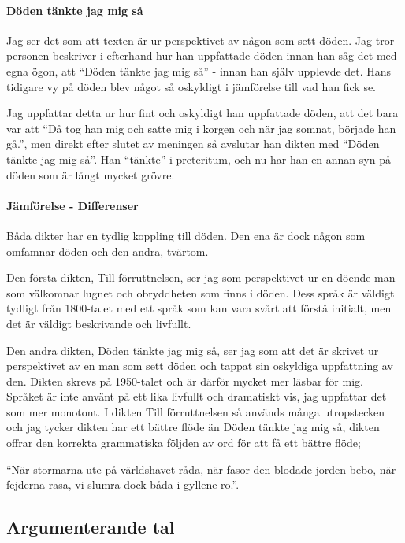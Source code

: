 \paragraph{Döden tänkte jag mig så}

Jag ser det som att texten är ur perspektivet av någon som sett döden. Jag tror personen beskriver i efterhand hur han uppfattade döden innan han såg det med egna ögon, att “Döden tänkte jag mig så” - innan han själv upplevde det. Hans tidigare vy på döden blev något så oskyldigt i jämförelse till vad han fick se.

Jag uppfattar detta ur hur fint och oskyldigt han uppfattade döden, att det bara var att “Då tog han mig och satte mig i korgen och när jag somnat, började han gå.”, men direkt efter slutet av meningen så avslutar han dikten med “Döden tänkte jag mig så”. Han “tänkte” i preteritum, och nu har han en annan syn på döden som är långt mycket grövre.

\paragraph{Jämförelse - Differenser}

Båda dikter har en tydlig koppling till döden. Den ena är dock någon som omfamnar döden och den andra, tvärtom.

Den första dikten, Till förruttnelsen, ser jag som perspektivet ur en döende man som välkomnar lugnet och obryddheten som finns i döden. Dess språk är väldigt tydligt från 1800-talet med ett språk som kan vara svårt att förstå initialt, men det är väldigt beskrivande och livfullt.

Den andra dikten, Döden tänkte jag mig så, ser jag som att det är skrivet ur perspektivet av en man som sett döden och tappat sin oskyldiga uppfattning av den. Dikten skrevs på 1950-talet och är därför mycket mer läsbar för mig. Språket är inte använt på ett lika livfullt och dramatiskt vis, jag uppfattar det som mer monotont. I dikten Till förruttnelsen så används många utropstecken och jag tycker dikten har ett bättre flöde än Döden tänkte jag mig så, dikten offrar den korrekta grammatiska följden av ord för att få ett bättre flöde; 

“När stormarna ute på världshavet råda, när fasor den blodade jorden bebo, när fejderna rasa, vi slumra dock båda i gyllene ro.”.

\newpage
\subsection{Argumenterande tal}

